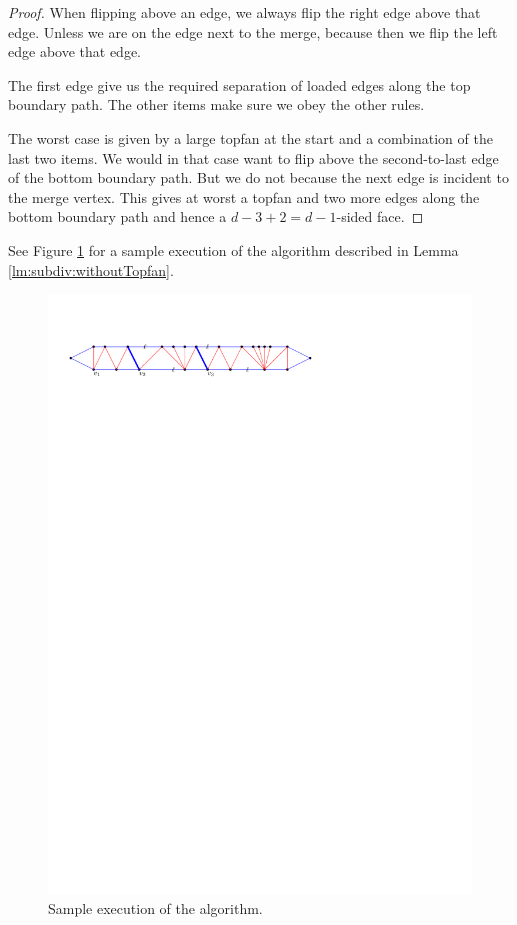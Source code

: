 \begin{proof}
  When flipping above an edge, we always flip the right edge above that edge. Unless we are on the edge next to the merge, because then we flip the left edge above that edge.

  The first edge give us the required separation of loaded edges along the top boundary path. The other items make sure we obey the other rules.

  The worst case is given by a large topfan at the start and  a combination of the last two items. We would in that case want to flip above the second-to-last edge of the bottom boundary path. But we do not because the next edge is incident to the merge vertex. This gives at worst a topfan and  two more edges along the bottom boundary path and hence a $ d - 3 +2 = d -1$-sided face.
  \end{proof}

  See Figure \ref{fig:subdiv:sampleExecution} for a sample execution of the algorithm described in Lemma \ref{lm:subdiv:withoutTopfan}.

  \begin{figure}[t]
    \centering
    \includegraphics[scale=1]{blueFaceSubdivision/img/sampleExecution}
    \caption{Sample execution of the algorithm.}
    \label{fig:subdiv:sampleExecution}
  \end{figure}

